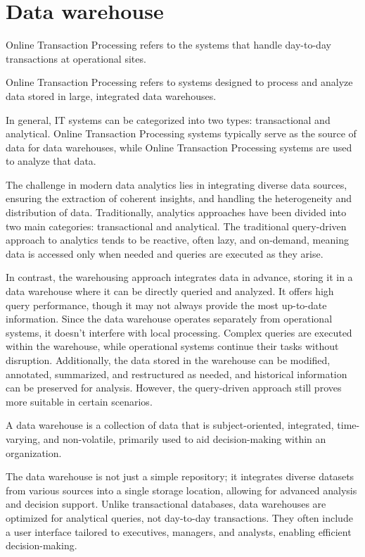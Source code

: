 \section{Data warehouse}

\begin{definition}
    Online Transaction Processing refers to the systems that handle day-to-day transactions at operational sites.
\end{definition}
\begin{definition}
    Online Transaction Processing refers to systems designed to process and analyze data stored in large, integrated data warehouses.
\end{definition}
\noindent In general, IT systems can be categorized into two types: transactional and analytical. 
Online Transaction Processing systems typically serve as the source of data for data warehouses, while Online Transaction Processing systems are used to analyze that data.

The challenge in modern data analytics lies in integrating diverse data sources, ensuring the extraction of coherent insights, and handling the heterogeneity and distribution of data. 
Traditionally, analytics approaches have been divided into two main categories: transactional and analytical. 
The traditional query-driven approach to analytics tends to be reactive, often lazy, and on-demand, meaning data is accessed only when needed and queries are executed as they arise.

In contrast, the warehousing approach integrates data in advance, storing it in a data warehouse where it can be directly queried and analyzed. 
It offers high query performance, though it may not always provide the most up-to-date information. 
Since the data warehouse operates separately from operational systems, it doesn't interfere with local processing. Complex queries are executed within the warehouse, while operational systems continue their tasks without disruption. 
Additionally, the data stored in the warehouse can be modified, annotated, summarized, and restructured as needed, and historical information can be preserved for analysis.
However, the query-driven approach still proves more suitable in certain scenarios. 
\begin{definition}
    A data warehouse is a collection of data that is subject-oriented, integrated, time-varying, and non-volatile, primarily used to aid decision-making within an organization.    
\end{definition}
The data warehouse is not just a simple repository; it integrates diverse datasets from various sources into a single storage location, allowing for advanced analysis and decision support.
Unlike transactional databases, data warehouses are optimized for analytical queries, not day-to-day transactions. 
They often include a user interface tailored to executives, managers, and analysts, enabling efficient decision-making.

